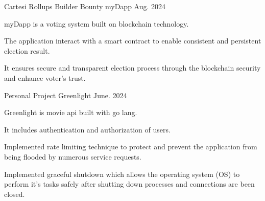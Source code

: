 
\begin{cventries}

  \cventry
  {Cartesi Rollups Builder Bounty} %
  {myDapp } %
  {} %
  {Aug. 2024} %
  {
    \begin{cvitems} %
      \item {myDapp is a voting system built on blockchain technology. }
      \item {The application interact with a smart contract to enable consistent and persistent election result.}
      \item {It ensures secure and transparent election process through the blockchain security and enhance voter's trust.}
    \end{cvitems}
  }
  \cventry
  {Personal Project} %
  {Greenlight } %
  {} %
  {June. 2024} %
  {
    \begin{cvitems} %
      \item {Greenlight is movie api built with go lang.}
      \item {It includes authentication and authorization of users.}
      \item {Implemented rate limiting technique to protect and prevent the application from being flooded by numerous service requests.}
      \item {Implemented graceful shutdown which allows the operating system (OS) to perform it's tasks safely after shutting down processes and connections are been closed.}
    \end{cvitems}
  }


\end{cventries}
